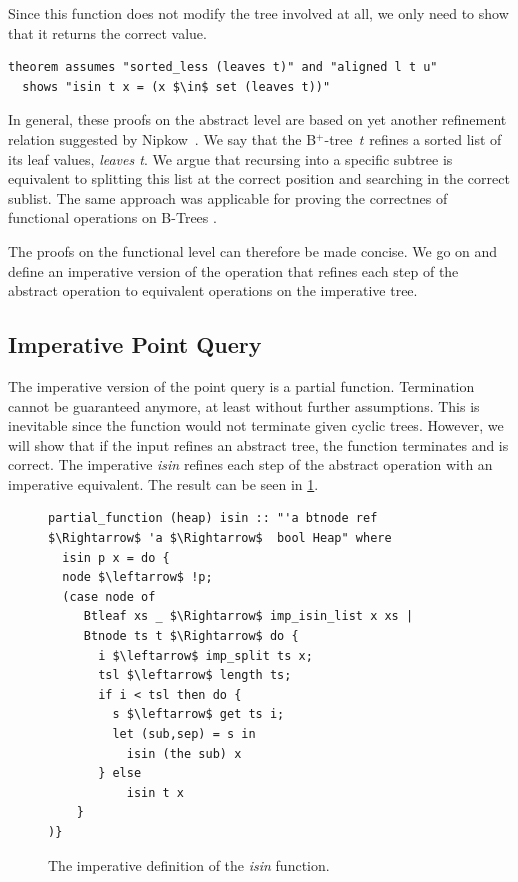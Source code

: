 \documentclass[a4paper,UKenglish,cleveref, cref, thm-restate]{lipics-v2021}
\newcommand{\btree}{B$^+$-tree}
\begin{document}
Since this function does not modify the tree involved at all,
we only need to show that it returns the correct value.

\begin{lstlisting}[mathescape=true, language=Isabelle,label=lst:isin-set-inorder]
theorem assumes "sorted_less (leaves t)" and "aligned l t u" 
  shows "isin t x = (x $\in$ set (leaves t))"
\end{lstlisting}

In general, these proofs on the abstract level are 
based on yet another refinement relation suggested by Nipkow~\cite{DBLP:conf/itp/Nipkow16}. 
We say that the \btree\ $t$ refines a sorted list of its leaf values, \emph{leaves t}.
We argue that recursing into a specific subtree
is equivalent to splitting this list at the correct position
and searching in the correct sublist.
The same approach was applicable for proving the correctnes of functional
operations on B-Trees \cite{DBLP:journals/afp/Mundler21}.

The proofs on the functional level can therefore be made concise.
We go on and define an imperative version of the operation that
refines each step of the abstract operation to equivalent operations on the imperative tree.

\subsection{Imperative Point Query}
\label{sec:imperative_pq}

The imperative version of the point query is a partial function.
Termination cannot be guaranteed anymore,
at least without further assumptions.
This is inevitable since the function would not terminate
given cyclic trees.
However, we will show that if the input refines an abstract tree,
the function terminates and is correct.
The imperative \emph{isin} refines each step of the abstract
operation with an imperative equivalent.
The result can be seen in \cref{fig:isin-imp-def}.

\begin{figure}
    \centering
\begin{lstlisting}[mathescape=true, language=Isabelle,label=lst:isin-imp-def]
partial_function (heap) isin :: "'a btnode ref $\Rightarrow$ 'a $\Rightarrow$  bool Heap" where
  isin p x = do {
  node $\leftarrow$ !p;
  (case node of
     Btleaf xs _ $\Rightarrow$ imp_isin_list x xs |
     Btnode ts t $\Rightarrow$ do {
       i $\leftarrow$ imp_split ts x;
       tsl $\leftarrow$ length ts;
       if i < tsl then do {
         s $\leftarrow$ get ts i;
         let (sub,sep) = s in
           isin (the sub) x
       } else
           isin t x
    }
)}
\end{lstlisting}
\caption[Definition of imperative \emph{isin}]{
    The imperative definition of the \emph{isin} function.
}
\label{fig:isin-imp-def}
\end{figure}
\end{document}
